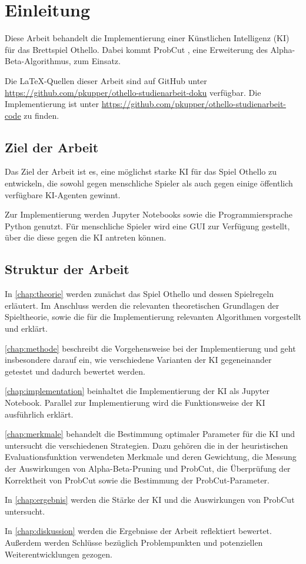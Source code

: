 
\chapter{Einleitung}
\label{chap:einleitung}

Diese Arbeit behandelt die Implementierung einer Künstlichen Intelligenz (\acs{KI}) für das Brettspiel Othello. Dabei kommt ProbCut
\cite[S.~1]{probcut}, eine Erweiterung des Alpha-Beta-Algorithmus, zum Einsatz.

Die \LaTeX-Quellen dieser Arbeit sind auf GitHub unter \url{https://github.com/pkupper/othello-studienarbeit-doku}
verfügbar. Die Implementierung ist unter \url{https://github.com/pkupper/othello-studienarbeit-code} zu finden.

\section{Ziel der Arbeit}
\label{sec:goal}

Das Ziel der Arbeit ist es, eine möglichst starke \ac{KI} für das Spiel Othello zu entwickeln, die sowohl
gegen menschliche Spieler als auch gegen einige öffentlich verfügbare \ac{KI}-Agenten gewinnt.

Zur Implementierung werden Jupyter Notebooks sowie die Programmiersprache Python genutzt.
Für menschliche Spieler wird eine \ac{GUI} zur Verfügung gestellt, über
die diese gegen die \ac{KI} antreten können.

\section{Struktur der Arbeit}
In \autoref{chap:theorie} werden zunächst das Spiel Othello und dessen Spielregeln erläutert. Im Anschluss werden die
relevanten theoretischen Grundlagen der Spieltheorie, sowie die für die Implementierung relevanten Algorithmen
vorgestellt und erklärt.

\autoref{chap:methode} beschreibt die Vorgehensweise bei der Implementierung und geht insbesondere darauf ein, wie
verschiedene Varianten der \ac{KI} gegeneinander getestet und dadurch bewertet werden.

\autoref{chap:implementation} beinhaltet die Implementierung der \ac{KI} als Jupyter Notebook. Parallel
zur Implementierung wird die Funktionsweise der \ac{KI} ausführlich erklärt.

\autoref{chap:merkmale} behandelt die Bestimmung optimaler Parameter für die \ac{KI} und untersucht die
verschiedenen Strategien. Dazu gehören die in der heuristischen Evaluationsfunktion verwendeten Merkmale und deren
Gewichtung, die Messung der Auswirkungen von Alpha-Beta-Pruning und ProbCut, die Überprüfung der Korrektheit von
ProbCut sowie die Bestimmung der ProbCut-Parameter.

In \autoref{chap:ergebnis} werden die Stärke der \ac{KI} und die Auswirkungen von ProbCut untersucht.

In \autoref{chap:diskussion} werden die Ergebnisse der Arbeit reflektiert bewertet. Außerdem werden Schlüsse bezüglich
Problempunkten und potenziellen Weiterentwicklungen gezogen.
